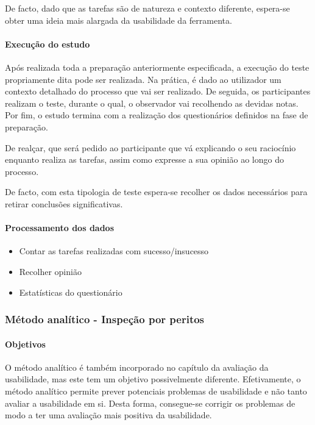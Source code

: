 De facto, dado que as tarefas são de natureza e contexto diferente,
espera-se obter uma ideia mais alargada da usabilidade da ferramenta.

\paragraph{Execução do estudo}
\label{sec:orgaff5f0e}
Após realizada toda a preparação anteriormente especificada, a execução do
teste propriamente dita pode ser realizada. Na prática, é dado ao utilizador
um contexto detalhado do processo que vai ser realizado. De seguida, os
participantes realizam o teste, durante o qual, o observador vai recolhendo
as devidas notas. Por fim, o estudo termina com a realização dos
questionários definidos na fase de preparação.

De realçar, que será pedido ao participante que vá explicando o seu raciocínio
enquanto realiza as tarefas, assim como expresse a sua opinião ao longo do
processo.

De facto, com esta tipologia de teste espera-se recolher os dados
necessários para retirar conclusões significativas.

\paragraph{Processamento dos dados}
\label{sec:org2aedb1d}

\begin{itemize}
    \item Contar as tarefas realizadas com sucesso/insucesso
    \item Recolher opinião
    \item Estatísticas do questionário
\end{itemize}

\subsubsection{Método analítico - Inspeção por peritos}
\label{sec:org7ae4da1}
\paragraph{Objetivos}
\label{sec:org8305494}
O método analítico é também incorporado no capítulo da avaliação da
usabilidade, mas este tem um objetivo possivelmente diferente. Efetivamente,
o método analítico permite prever potenciais problemas de usabilidade e não
tanto avaliar a usabilidade em si. Desta forma, consegue-se corrigir os
problemas de modo a ter uma avaliação mais positiva da usabilidade.

